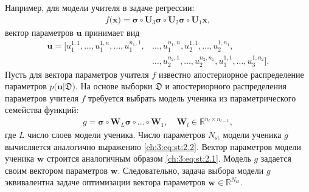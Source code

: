 Например, для модели учителя в задаче регрессии:
\[
\label{ch:3:eq:st:3}
\begin{aligned}
f\bigr(\mathbf{x}\bigr) = \bm{\sigma} \circ \mathbf{U}_3 \bm{\sigma} \circ \mathbf{U}_2\bm{\sigma}\circ \mathbf{U}_1\mathbf{x},
\end{aligned}
\]
вектор параметров $\mathbf{u}$ принимает вид
\[
\label{ch:3:eq:st:4}
\begin{aligned}
\mathbf{u} = \bigr[u_1^{1,1}, \ldots, u_1^{1,n},
                                               \ldots, 
                             u_1^{n_1,1}, &\ldots, u_1^{n_1,n},  
                             u_2^{1, 1}, \ldots, u_2^{1, n_1}, \\
                                                & \ldots, 
                            u_2^{n_2, 1}, \ldots, u_2^{n_2, n_1},
                            u_3^{1, 1}, \ldots, u_3^{1, n_2}\bigr].
\end{aligned}
\]
Пусть для вектора параметров учителя $f$ известно апостериорное распределение параметров $p\bigr(\mathbf{u}|\mathfrak{D}\bigr)$. 
На основе выборки $\mathfrak{D}$ и апостериорного распределения параметров учителя $f$ требуется выбрать модель ученика из параметрического семейства функций:
\[
\label{ch:3:eq:st:5}
\begin{aligned}
g = \bm{\sigma} \circ \mathbf{W}_L\bm{\sigma}  \circ \ldots \circ \mathbf{W}_1, \quad \mathbf{W}_l \in \mathbb{R}^{n_l \times n_{l-1}},
\end{aligned}
\]
где $L$ число слоев модели ученика.
Число параметров $N_{\text{st}}$ модели ученика $g$ вычисляется аналогично выражению \eqref{ch:3:eq:st:2.2}.
Вектор параметров модели ученика $\mathbf{w}$ строится аналогичным образом \eqref{ch:3:eq:st:2.1}.
Модель $g$ задается своим вектором параметров $\mathbf{w}$.
Следовательно, задача выбора модели $g$ эквивалентна задаче оптимизации вектора параметров $\mathbf{w}\in\mathbb{R}^{N_{\text{st}}}$.

